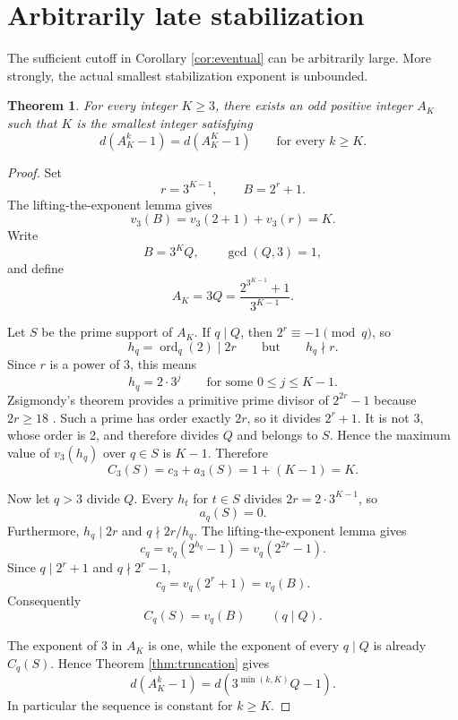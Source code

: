\documentclass[a4paper]{article}
\newtheorem{theorem}{Theorem}[section]
\newcommand{\ord}[2][]{\operatorname{ord}_{#1}\!\left(#2\right)}
\begin{document}
\section{Arbitrarily late stabilization}

The sufficient cutoff in Corollary \ref{cor:eventual} can be arbitrarily large.
More strongly, the actual smallest stabilization exponent is unbounded.

\begin{theorem}\label{thm:unbounded}
	For every integer $K\geq3$, there exists an odd positive integer $A_K$ such that $K$ is the smallest integer satisfying
	\[
		d(A_K^k-1)=d(A_K^K-1)
		\qquad\text{for every }k\geq K.
	\]
\end{theorem}

\begin{proof}
	Set
	\[
		r=3^{K-1},
		\qquad
		B=2^r+1.
	\]
	The lifting-the-exponent lemma gives
	\[
		v_3(B)=v_3(2+1)+v_3(r)=K.
	\]
	Write
	\[
		B=3^KQ,
		\qquad \gcd(Q,3)=1,
	\]
	and define
	\begin{equation}\label{eq:construction}
		A_K=3Q=\frac{2^{3^{K-1}}+1}{3^{K-1}}.
	\end{equation}

	Let $S$ be the prime support of $A_K$.
	If $q\mid Q$, then $2^r\equiv-1\pmod q$, so
	\[
		h_q=\ord[q]{2}\mid2r
		\qquad\text{but}\qquad
		h_q\nmid r.
	\]
	Since $r$ is a power of 3, this means
	\[
		h_q=2\cdot3^j
		\qquad\text{for some }0\leq j\leq K-1.
	\]
	Zsigmondy's theorem provides a primitive prime divisor of $2^{2r}-1$ because $2r\geq18$ \cite{Zsigmondy1892}.
	Such a prime has order exactly $2r$, so it divides $2^r+1$.
	It is not 3, whose order is 2, and therefore divides $Q$ and belongs to $S$.
	Hence the maximum value of $v_3(h_q)$ over $q\in S$ is $K-1$.
	Therefore
	\[
		C_3(S)=c_3+a_3(S)=1+(K-1)=K.
	\]

	Now let $q>3$ divide $Q$.
	Every $h_t$ for $t\in S$ divides $2r=2\cdot3^{K-1}$, so
	\[
		a_q(S)=0.
	\]
	Furthermore, $h_q\mid2r$ and $q\nmid 2r/h_q$.
	The lifting-the-exponent lemma gives
	\[
		c_q
		=
		v_q(2^{h_q}-1)
		=
		v_q(2^{2r}-1).
	\]
	Since $q\mid2^r+1$ and $q\nmid2^r-1$,
	\[
		c_q=v_q(2^r+1)=v_q(B).
	\]
	Consequently
	\[
		C_q(S)=v_q(B)
		\qquad(q\mid Q).
	\]

	The exponent of 3 in $A_K$ is one, while the exponent of every $q\mid Q$ is already $C_q(S)$.
	Hence Theorem \ref{thm:truncation} gives
	\begin{equation}\label{eq:constructed-sequence}
		d(A_K^k-1)
		=
		d(3^{\min(k,K)}Q-1).
	\end{equation}
	In particular the sequence is constant for $k\geq K$.


\end{proof}
\end{document}

